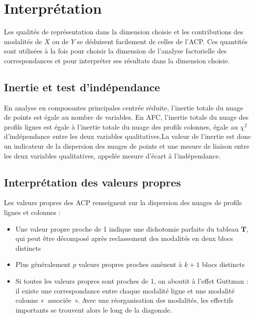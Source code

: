 \documentclass[letterpaper,10pt,french]{sphinxmanual}
\begin{document}
\section{Interprétation}
\label{\detokenize{afc:interpretation}}
\sphinxAtStartPar
Les qualités de représentation dans la dimension choisie et les contributions
des modalités de \(X\) ou de \(Y\) se déduisent facilement de celles de l’ACP. Ces
quantités sont utilisées à la fois pour choisir la dimension de l’analyse factorielle des correspondances  et pour interpréter ses résultats dans la dimension choisie.


\subsection{Inertie et test d’indépendance}
\label{\detokenize{afc:inertie-et-test-d-independance}}
\sphinxAtStartPar
En analyse en composantes principales centrée réduite, l’inertie totale du nuage de points est  égale au nombre de variables. En AFC,  l’inertie totale du nuage des profils lignes est  égale à l’inertie totale du nuage des profils colonnes, égale au \(\chi^2\) d’indépendance entre les deux variables qualitatives.La valeur de l’inertie est donc un indicateur de la dispersion des nuages de points et une mesure de liaison entre les deux variables qualitatives,  appelée mesure d’écart à l’indépendance.


\subsection{Interprétation des valeurs propres}
\label{\detokenize{afc:interpretation-des-valeurs-propres}}
\sphinxAtStartPar
Les valeurs propres des ACP renseignent sur la dispersion des nuages de profils lignes et colonnes :
\begin{itemize}
\item {} 
\sphinxAtStartPar
Une valeur propre proche de 1 indique une dichotomie parfaite du tableau \(\mathbf T\), qui peut être décomposé après reclassement des modalités en deux blocs distincts

\item {} 
\sphinxAtStartPar
Plus généralement \(p\) valeurs propres proches amènent à \(k+1\) blocs distincts

\item {} 
\sphinxAtStartPar
Si toutes les valeurs propres sont proches de 1, on aboutit à l’effet Guttman : il existe une correspondance entre chaque modalité ligne et une modalité colonne « associée ». Avec une réorganisation des modalités, les effectifs importants se trouvent alors le long de la diagonale.

\end{itemize}
\end{document}
